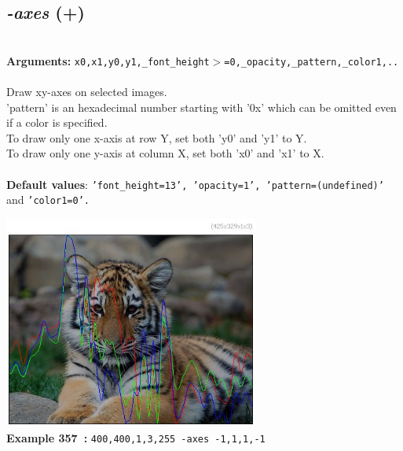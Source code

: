 \documentclass[a4paper,11pt,twoside]{book}
\begin{document}
\subsection{\emph{-axes} (+)}\vspace*{-0.5em}
~\\\textbf{Arguments: } 
{\small \texttt{x0,x1,y0,y1,\_font\_height$>$=0,\_opacity,\_pattern,\_color1,..}}\\~\\
Draw xy-axes on selected images.
~\\'pattern' is an hexadecimal number starting with '0x' which can be omitted
even if a color is specified.
~\\To draw only one x-axis at row Y, set both 'y0' and 'y1' to Y.
~\\To draw only one y-axis at column X, set both 'x0' and 'x1' to X.
~\\~\\\textbf{Default values}: {\small \texttt{'font\_height=13', 'opacity=1', 'pattern=(undefined)'} and \texttt{'color1=0'.}}
\begin{center}\includegraphics[keepaspectratio=true,height=7cm,width=\textwidth]{img/gmic_def357.jpg}\\
{\footnotesize \textbf{Example 357~:} \texttt{400,400,1,3,255 -axes -1,1,1,-1}}
\end{center}
\end{document}

